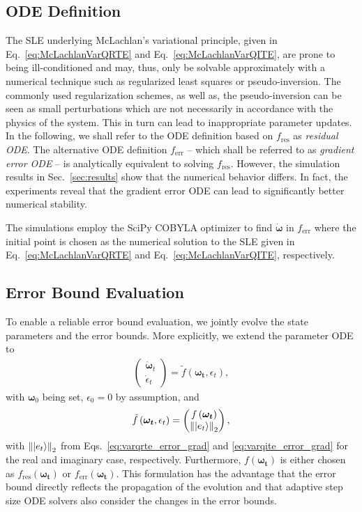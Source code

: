 \documentclass[twocolumn, aps, pra, superscriptaddress]{revtex4-1}
\newcommand{\norm}[1]{\left\lVert#1\right\rVert}
\begin{document}
\subsection{ODE Definition}
The SLE underlying McLachlan's variational principle, given in Eq.~\eqref{eq:McLachlanVarQRTE} and Eq.~\eqref{eq:McLachlanVarQITE}, are prone to being ill-conditioned and may, thus, only be solvable approximately with a numerical technique such as regularized least squares or pseudo-inversion. The commonly used regularization schemes, as well as, the pseudo-inversion can be seen as small perturbations which are not necessarily in accordance with the physics of the system. This in turn can lead to inappropriate parameter updates. In the following, we shall refer to the ODE definition based on $ f_{\text{res}}$ as \textit{residual ODE}.
The alternative ODE definition $f_{\text{err}}$ --  which shall be referred to as \textit{gradient error ODE} -- is analytically equivalent to solving $ f_{\text{res}}$. However, the simulation results in Sec.~\ref{sec:results} show that the numerical behavior differs.
In fact, the experiments reveal that the gradient error ODE can lead to significantly better numerical stability. 

The simulations employ the SciPy COBYLA optimizer \cite{2020SciPy-NMeth} to find $\boldsymbol{\dot\omega}$ in $f_{\text{err}}$ where the initial point is chosen
as the numerical solution to the SLE given in Eq.~\eqref{eq:McLachlanVarQRTE} and Eq.~\eqref{eq:McLachlanVarQITE}, respectively.

\subsection{Error Bound Evaluation}
\label{sec:ode_form}
To enable a reliable error bound evaluation, we jointly evolve the state parameters and the error bounds. 
More explicitly, we extend the parameter  ODE to
\begin{align}
        \begin{pmatrix}
       \boldsymbol{\dot \omega}_t \\
    \dot \epsilon_t
    \end{pmatrix}= 
        \tilde f\left(\bm{\omega_t}, \epsilon_t\right),
\end{align}
with  $\bm{\omega}_0$ being set, $\epsilon_0 = 0$ by assumption, and 
\begin{align}
    \tilde f\left(\bm{\omega_t}, \epsilon_t\right)=\begin{pmatrix}
        f\left(\bm{\omega_t}\right) \\
        \norm{\ket{e_t}}_2
    \end{pmatrix},
\end{align}
with $\norm{\ket{e_t}}_2$ from Eqs.~\eqref{eq:varqrte_error_grad} and \eqref{eq:varqite_error_grad} for the real and imaginary case, respectively. Furthermore, $ f\left(\bm{\omega_t}\right)$ is either chosen as $ f_{\text{res}}\left(\bm{\omega_t}\right)$ or $f_{\text{err}}\left(\bm{\omega_t}\right)$.
This formulation has the advantage that the error bound directly reflects the propagation of the evolution and that adaptive step size ODE solvers also consider the changes in the error bounds.
\end{document}
